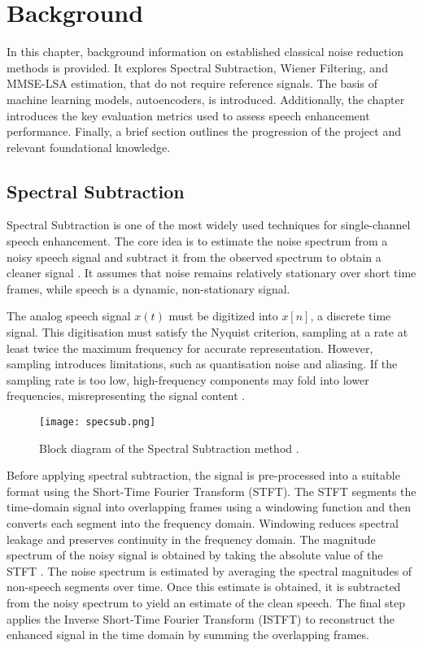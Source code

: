 \graphicspath{{content/chapters/2_background/figures/}}
\chapter{Background}
\label{chp:background}

In this chapter, background information on established classical noise reduction methods is provided. It explores Spectral Subtraction, Wiener Filtering, and MMSE-LSA estimation, that do not require reference signals. The basis of machine learning models, autoencoders, is introduced. Additionally, the chapter introduces the key evaluation metrics used to assess speech enhancement performance. Finally, a brief section outlines the progression of the project and relevant foundational knowledge.

\section{Spectral Subtraction}
\label{sec:spectral_subtraction}

Spectral Subtraction is one of the most widely used techniques for single-channel speech enhancement. The core idea is to estimate the noise spectrum from a noisy speech signal and subtract it from the observed spectrum to obtain a cleaner signal \cite{loizou2013speech}. It assumes that noise remains relatively stationary over short time frames, while speech is a dynamic, non-stationary signal.

The analog speech signal \(x(t)\) must be digitized into \(x[n]\), a discrete time signal. This digitisation must satisfy the Nyquist criterion, sampling at a rate at least twice the maximum frequency for accurate representation. However, sampling introduces limitations, such as quantisation noise and aliasing. If the sampling rate is too low, high-frequency components may fold into lower frequencies, misrepresenting the signal content \cite{loizou2013speech}.

\begin{figure}[h]
    \centering
    \texttt{[image: specsub.png]}
    \caption{\label{fig:SSBlock} Block diagram of the Spectral Subtraction method \cite{dubey2016evaluation}.}
\end{figure}

Before applying spectral subtraction, the signal is pre-processed into a suitable format using the Short-Time Fourier Transform (STFT). The STFT segments the time-domain signal into overlapping frames using a windowing function and then converts each segment into the frequency domain. Windowing reduces spectral leakage and preserves continuity in the frequency domain. The magnitude spectrum of the noisy signal is obtained by taking the absolute value of the STFT \cite{dubey2016evaluation}. The noise spectrum is estimated by averaging the spectral magnitudes of non-speech segments over time. Once this estimate is obtained, it is subtracted from the noisy spectrum to yield an estimate of the clean speech. The final step applies the Inverse Short-Time Fourier Transform (ISTFT) to reconstruct the enhanced signal in the time domain by summing the overlapping frames.


